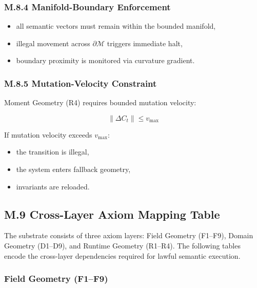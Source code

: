 \subsubsection*{M.8.4 Manifold-Boundary Enforcement}

\begin{itemize}
    \item all semantic vectors must remain within the bounded manifold,
    \item illegal movement across $\partial \mathcal{M}$ triggers immediate halt,
    \item boundary proximity is monitored via curvature gradient.
\end{itemize}

\subsubsection*{M.8.5 Mutation-Velocity Constraint}

Moment Geometry (R4) requires bounded mutation velocity:



\[
\|\Delta C_t\| \le v_{\max}
\]



If mutation velocity exceeds $v_{\max}$:
\begin{itemize}
    \item the transition is illegal,
    \item the system enters fallback geometry,
    \item invariants are reloaded.
\end{itemize}

\subsection*{M.9 Cross-Layer Axiom Mapping Table}

The substrate consists of three axiom layers:  
Field Geometry (F1–F9), Domain Geometry (D1–D9), and Runtime Geometry (R1–R4).  
The following tables encode the cross-layer dependencies required for lawful
semantic execution.

\subsubsection*{Field Geometry (F1–F9)}

